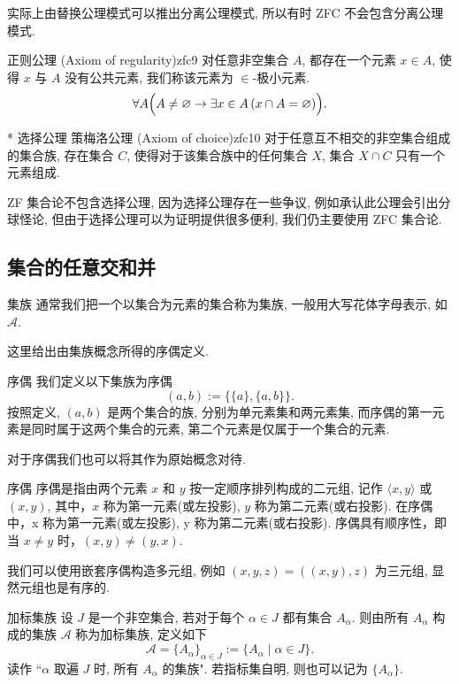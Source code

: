 \documentclass[cn,toc=twocol]{elegantbook}
\begin{document}
实际上由替换公理模式可以推出分离公理模式, 所以有时 ZFC 不会包含分离公理模式.

\begin{axiom}{正则公理 (Axiom of regularity)}{zfc9}
	对任意非空集合 $A$, 都存在一个元素 $x \in A$, 使得 $x$ 与 $A$ 没有公共元素, 我们称该元素为 $\in$-极小元素.
	\[
		\forall A\Bigl(A\neq\varnothing\to \exists x\in A\,(x\cap A=\varnothing)\Bigr).
	\]
\end{axiom}

	
\begin{axiom}{* 选择公理 策梅洛公理 (Axiom of choice)}{zfc10}
	对于任意互不相交的非空集合组成的集合族, 存在集合 $C$, 使得对于该集合族中的任何集合 $X$, 集合 $X\cap C$ 只有一个元素组成.
\end{axiom}

ZF 集合论不包含选择公理, 因为选择公理存在一些争议, 例如承认此公理会引出分球怪论, 但由于选择公理可以为证明提供很多便利, 我们仍主要使用 ZFC 集合论.

\subsection{集合的任意交和并}

\begin{definition}{集族}
通常我们把一个以集合为元素的集合称为集族, 一般用大写花体字母表示, 如 $\mathscr{A}$.
\end{definition}

这里给出由集族概念所得的序偶定义.

\begin{definition}{序偶}
我们定义以下集族为序偶
\[
	(a,b) := \{\{a\},\{a,b\}\}.
\]
按照定义, $(a,b)$ 是两个集合的族, 分别为单元素集和两元素集, 而序偶的第一元素是同时属于这两个集合的元素, 第二个元素是仅属于一个集合的元素.
\end{definition}

对于序偶我们也可以将其作为原始概念对待. 

\begin{definition}{序偶}
序偶是指由两个元素 $x$ 和 $y$ 按一定顺序排列构成的二元组, 记作 $\langle x, y \rangle$ 或 $(x, y)$, 其中，$x$ 称为第一元素(或左投影), $y$ 称为第二元素(或右投影). 在序偶中，x 称为第一元素(或左投影), y 称为第二元素(或右投影). 序偶具有顺序性，即当 $x \neq y$ 时，$(x,y) \neq (y,x)$.
\end{definition}

我们可以使用嵌套序偶构造多元组, 例如 $(x,y,z) = ((x,y),z)$ 为三元组, 显然元组也是有序的.

\begin{definition}{加标集族}
设 $J$ 是一个非空集合, 若对于每个 $\alpha \in J$ 都有集合 $A_\alpha$. 则由所有 $A_\alpha$ 构成的集族 $\mathscr{A}$ 称为加标集族, 定义如下
\[
	\mathscr{A} = \{A_\alpha\}_{\alpha \in J} := \{A_\alpha\mid \alpha \in J \}.
\]
读作 ``$\alpha$ 取遍 $J$ 时, 所有 $A_\alpha$ 的集族". 若指标集自明, 则也可以记为 $\{A_\alpha\}$.
\end{definition}
\end{document}
